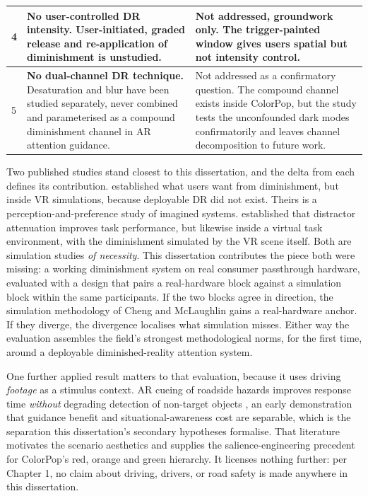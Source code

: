 \begin{longtable}{p{}|p{}|p{}}
4 & \textbf{No user-controlled DR intensity.} User-initiated, graded release and re-application of diminishment is unstudied. & Not addressed, groundwork only. The trigger-painted window gives users spatial but not intensity control. \\
\hline
5 & \textbf{No dual-channel DR technique.} Desaturation and blur have been studied separately, never combined and parameterised as a compound diminishment channel in AR attention guidance. & Not addressed as a confirmatory question. The compound channel exists inside ColorPop, but the study tests the unconfounded dark modes confirmatorily and leaves channel decomposition to future work. \\
\hline
\end{longtable}

Two published studies stand closest to this dissertation, and the delta from each defines its
contribution. \textbf{\citet{cheng2022}} established what users want from diminishment, but inside VR
simulations, because deployable DR did not exist. Theirs is a perception-and-preference study of
imagined systems. \textbf{\citet{mclaughlin2025}} established that distractor attenuation improves
task performance, but likewise inside a virtual task environment, with the diminishment simulated by
the VR scene itself. Both are simulation studies \textit{of necessity}. This dissertation contributes
the piece both were missing: a working diminishment system on real consumer passthrough hardware,
evaluated with a design that pairs a real-hardware block against a simulation block within the same
participants. If the two blocks agree in direction, the simulation methodology of Cheng and
McLaughlin gains a real-hardware anchor. If they diverge, the divergence localises what simulation
misses. Either way the evaluation assembles the field's strongest methodological norms, for the
first time, around a deployable diminished-reality attention system.

One further applied result matters to that evaluation, because it uses driving \textit{footage} as
a stimulus context. AR cueing of roadside hazards improves response time \textit{without} degrading
detection of non-target objects \citep[N = 27]{rusch2013}, an early demonstration that guidance
benefit and situational-awareness cost are separable, which is the separation this dissertation's
secondary hypotheses formalise. That literature motivates the scenario aesthetics and supplies the
salience-engineering precedent for ColorPop's red, orange and green hierarchy. It licenses nothing
further: per Chapter 1, no claim about driving, drivers, or road safety is made anywhere in this
dissertation.
